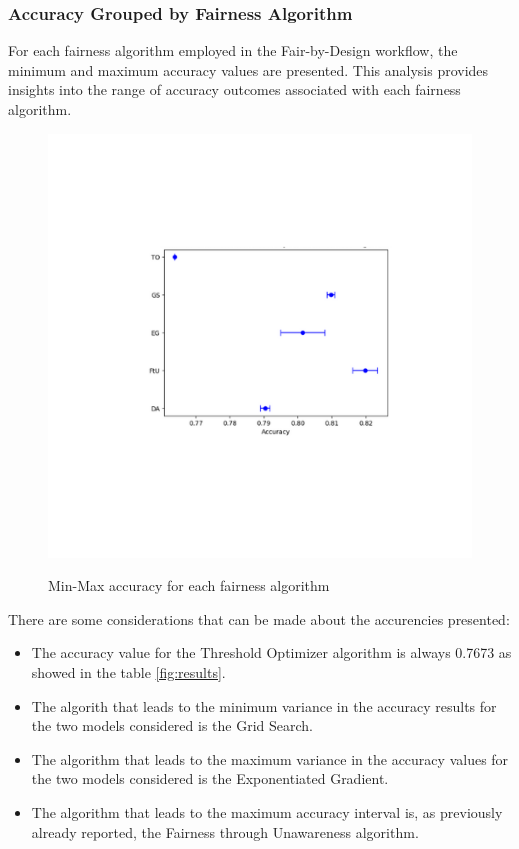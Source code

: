 \newpage
\subsubsection{Accuracy Grouped by Fairness Algorithm}

For each fairness algorithm employed in the Fair-by-Design workflow, the minimum and maximum accuracy values are presented. This analysis provides insights into the range of accuracy outcomes associated with each fairness algorithm.

\begin{figure}[H]
    \centering
    \includegraphics[width=1.0\textwidth, height=1.0\textwidth]{accuracy.png}
    \label{fig:acc_alg}
    \caption{Min-Max accuracy for each fairness algorithm}
\end{figure}

There are some considerations that can be made about the accurencies presented:

\begin{itemize}

    \item The accuracy value for the Threshold Optimizer algorithm is always 0.7673 as showed in the table \cref{fig:results}.

    \item The algorith that leads to the minimum variance in the accuracy results for the two models considered is the Grid Search.

    \item The algorithm that leads to the maximum variance in the accuracy values for the two models considered is the Exponentiated Gradient.

    \item The algorithm that leads to the maximum accuracy interval is, as previously already reported, the Fairness through Unawareness algorithm.

\end{itemize}

